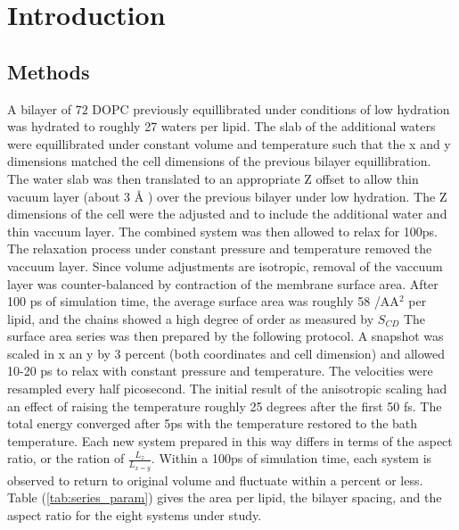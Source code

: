 \documentclass[doublespacing]{elsart}
\begin{document}



\setlength{\headheight}{28pts}

\section{Introduction}

\subsection{Methods}
A bilayer of $72$ DOPC previously equillibrated under conditions of
low hydration \cite{FELLER96} was hydrated to roughly 27 waters per
lipid. The slab of the additional waters were equillibrated under
constant volume and temperature such that the x and y dimensions
matched the cell dimensions of the previous bilayer
equillibration. The water slab was then translated to an appropriate Z
offset to allow thin vacuum layer (about 3 {\AA } ) over the previous
bilayer under low hydration. The Z dimensions of the cell were the
adjusted and to include the additional water and thin vaccuum
layer. The combined system was then allowed to relax for 100ps. The
relaxation process under constant pressure and temperature removed the
vaccuum layer. Since volume adjustments are isotropic, removal of the
vaccuum layer was counter-balanced by contraction of the membrane
surface area. After 100 ps of simulation time, the average surface
area was roughly 58 {/AA$^2$ } per lipid, and the chains showed a high
degree of order as measured by $S_{CD}$ The surface area series was
then prepared by the following protocol. A snapshot was scaled in x an
y by 3 percent (both coordinates and cell dimension) and allowed 10-20
ps to relax with constant pressure and temperature. The velocities
were resampled every half picosecond. The initial result of the
anisotropic scaling had an effect of raising the temperature roughly
25 degrees after the first 50 fs. The total energy converged after 5ps
with the temperature restored to the bath temperature. Each new system
prepared in this way differs in terms of the aspect ratio, or the
ration of $\frac{L_z}{L_{x=y}}$. Within a 100ps of simulation time,
each system is observed to return to original volume and fluctuate
within a percent or less. Table (\ref{tab:series_param}) gives the
area per lipid, the bilayer spacing, and the aspect ratio for the
eight systems under study.
 
\end{document}
